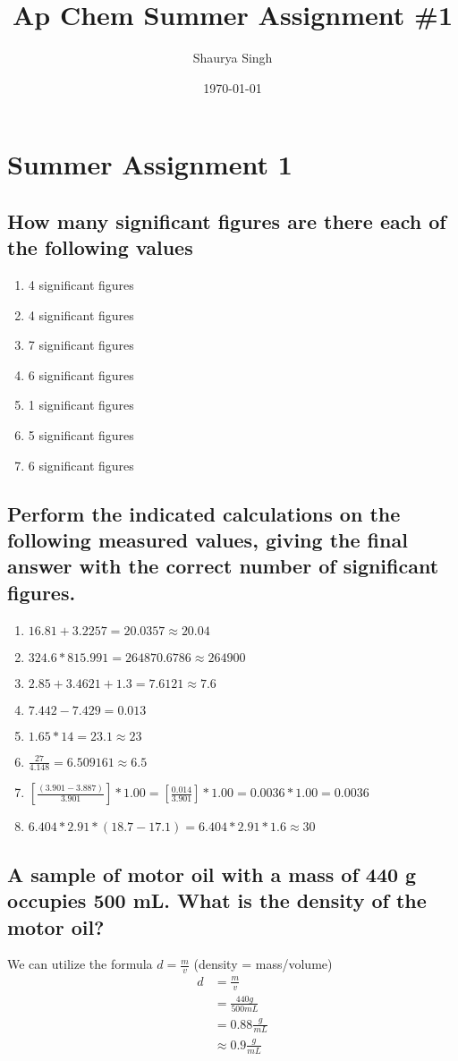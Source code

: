 \documentclass[11pt]{article}
\author{Shaurya Singh}
\date{\today}
\title{Ap Chem Summer Assignment \#1}
\begin{document}
\maketitle

\section{Summer Assignment 1}
\label{sec:org254ad55}
\subsection{How many significant figures are there each of the following values}
\label{sec:orgbaa55c0}
\begin{enumerate}
\item 4 significant figures
\item 4 significant figures
\item 7 significant figures
\item 6 significant figures
\item 1 significant figures
\item 5 significant figures
\item 6 significant figures
\end{enumerate}

\subsection{Perform the indicated calculations on the following measured values, giving the final answer with the correct number of significant figures.}
\label{sec:org3278ffb}
\begin{enumerate}
\item \(16.81 + 3.2257 = 20.0357 \approx 20.04\)
\item \(324.6 * 815.991 = 264870.6786 \approx 264900\)
\item \(2.85 + 3.4621 + 1.3 = 7.6121 \approx 7.6\)
\item \(7.442 - 7.429 = 0.013\)
\item \(1.65 * 14 = 23.1 \approx 23\)
\item \(\frac{27}{4.148} = 6.509161 \approx 6.5\)
\item \([\frac{(3.901 - 3.887)}{3.901}] * 1.00 = [\frac{0.014}{3.901}] * 1.00 = 0.0036 * 1.00 = 0.0036\)
\item \(6.404 * 2.91 * (18.7 - 17.1) = 6.404 * 2.91 * 1.6 \approx 30\)
\end{enumerate}

\subsection{A sample of motor oil with a mass of 440 g occupies 500 mL. What is the density of the motor oil?}
\label{sec:org332e230}
We can utilize the formula \(d=\frac{m}{v}\) (density = mass/volume)
\begin{align*}
d&=\frac{m}{v}\\
&=\frac{440g}{500mL}\\
&=0.88\frac{g}{mL}\\
&\approx0.9\frac{g}{mL}
\end{align*}
\end{document}
